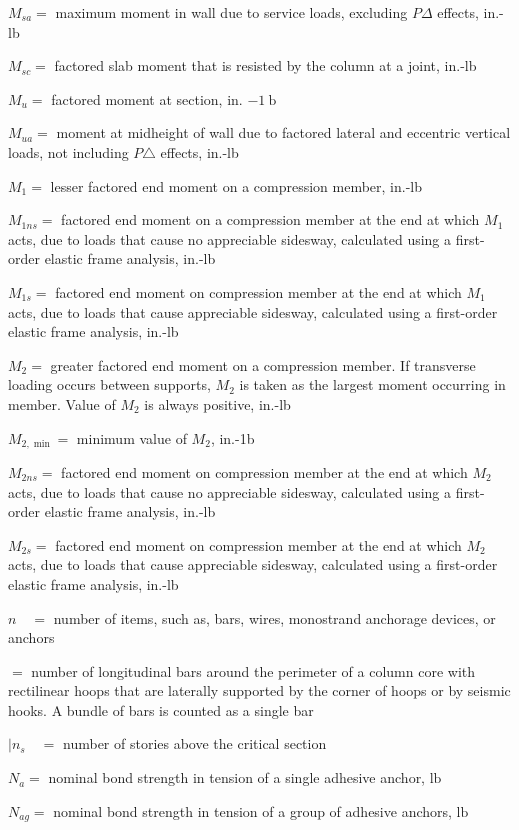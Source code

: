 \documentclass[10pt]{article}
\begin{document}
$M_{s a}=$ maximum moment in wall due to service loads, excluding $P \Delta$ effects, in.-lb

$M_{s c}=$ factored slab moment that is resisted by the column at a joint, in.-lb

$M_{u}=$ factored moment at section, in. $-1 \mathrm{~b}$

$M_{u a}=$ moment at midheight of wall due to factored lateral and eccentric vertical loads, not including $P \triangle$ effects, in.-lb

$M_{1}=$ lesser factored end moment on a compression member, in.-lb

$M_{1 n s}=$ factored end moment on a compression member at the end at which $M_{1}$ acts, due to loads that cause no appreciable sidesway, calculated using a first-order elastic frame analysis, in.-lb

$M_{1 s}=$ factored end moment on compression member at the end at which $M_{1}$ acts, due to loads that cause appreciable sidesway, calculated using a first-order elastic frame analysis, in.-lb

$M_{2}=$ greater factored end moment on a compression member. If transverse loading occurs between supports, $M_{2}$ is taken as the largest moment occurring in member. Value of $M_{2}$ is always positive, in.-lb

$M_{2, \min }=$ minimum value of $M_{2}$, in.-1b

$M_{2 n s}=$ factored end moment on compression member at the end at which $M_{2}$ acts, due to loads that cause no appreciable sidesway, calculated using a first-order elastic frame analysis, in.-lb

$M_{2 s}=$ factored end moment on compression member at the end at which $M_{2}$ acts, due to loads that cause appreciable sidesway, calculated using a first-order elastic frame analysis, in.-lb

$n \quad=$ number of items, such as, bars, wires, monostrand anchorage devices, or anchors

$=$ number of longitudinal bars around the perimeter of a column core with rectilinear hoops that are laterally supported by the corner of hoops or by seismic hooks. A bundle of bars is counted as a single bar

$\mid n_{s} \quad=$ number of stories above the critical section

$N_{a}=$ nominal bond strength in tension of a single adhesive anchor, $\mathrm{lb}$

$N_{a g}=$ nominal bond strength in tension of a group of adhesive anchors, $\mathrm{lb}$
\end{document}
